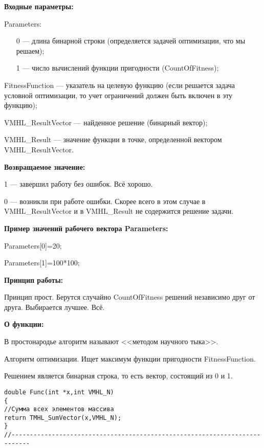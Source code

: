 \textbf{Входные параметры:}

 Parameters:
 
 \begin{itemize}
 \item [0] --- длина бинарной строки (определяется задачей оптимизации, что мы решаем);
 \item [1] --- число вычислений функции пригодности (CountOfFitness);
 \end{itemize}
  
 FitnessFunction --- указатель на целевую функцию (если решается задача условной оптимизации, то учет ограничений должен быть включен в эту функцию);
 
 VMHL\_ResultVector --- найденное решение (бинарный вектор);
 
 VMHL\_Result --- значение функции в точке, определенной вектором VMHL\_ResultVector.

\textbf{Возвращаемое значение:}
 
 1 --- завершил работу без ошибок. Всё хорошо.
 
 0 --- возникли при работе ошибки. Скорее всего в этом случае в VMHL\_ResultVector и в VMHL\_Result не содержится решение задачи.
 
\textbf{Пример значений рабочего вектора Parameters:}

 Parameters[0]=20;
 
 Parameters[1]=100*100;
 
 \textbf{Принцип работы:}
 
 Принцип прост. Берутся случайно CountOfFitness решений независимо друг от друга. Выбирается лучшее. Всё.
 
 \textbf{ О функции:}
 
 В простонародье алгоритм называют <<методом научного тыка>>.
 
Алгоритм оптимизации. Ищет максимум функции пригодности FitnessFunction.

Решением является бинарная строка, то есть вектор, состоящий из 0 и 1.

\begin{lstlisting}[caption=Оптимизируемая функция]
double Func(int *x,int VMHL_N)
{
//Сумма всех элементов массива
return TMHL_SumVector(x,VMHL_N);
}
//---------------------------------------------------------------------------
\end{lstlisting}